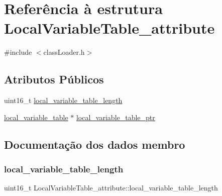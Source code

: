 \hypertarget{struct_local_variable_table__attribute}{}\section{Referência à estrutura Local\+Variable\+Table\+\_\+attribute}
\label{struct_local_variable_table__attribute}


{\ttfamily \#include $<$class\+Loader.\+h$>$}

\subsection*{Atributos Públicos}
\begin{DoxyCompactItemize}
\item 
uint16\+\_\+t \hyperlink{struct_local_variable_table__attribute_a3828e58e5608b7da6dfbf0399b15b092}{local\+\_\+variable\+\_\+table\+\_\+length}
\item 
\hyperlink{structlocal__variable__table}{local\+\_\+variable\+\_\+table} $\ast$ \hyperlink{struct_local_variable_table__attribute_a344c097a0c1792b8a042a8ef05cbfe68}{local\+\_\+variable\+\_\+table\+\_\+ptr}
\end{DoxyCompactItemize}


\subsection{Documentação dos dados membro}
\hypertarget{struct_local_variable_table__attribute_a3828e58e5608b7da6dfbf0399b15b092}{}\label{struct_local_variable_table__attribute_a3828e58e5608b7da6dfbf0399b15b092} 
\subsubsection{\texorpdfstring{local\+\_\+variable\+\_\+table\+\_\+length}{local\_variable\_table\_length}}
{\footnotesize\ttfamily uint16\+\_\+t Local\+Variable\+Table\+\_\+attribute\+::local\+\_\+variable\+\_\+table\+\_\+length}

\hypertarget{struct_local_variable_table__attribute_a344c097a0c1792b8a042a8ef05cbfe68}{}\label{struct_local_variable_table__attribute_a344c097a0c1792b8a042a8ef05cbfe68} 
